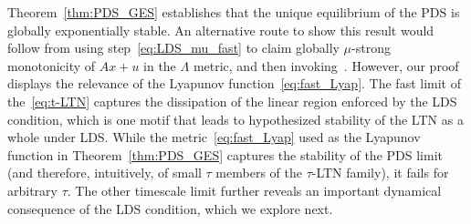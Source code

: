 \documentclass[letterpaper, conference]{ieeeconf}
\newcommand{\1}{\mathbf{1}}
\begin{document}
\medskip

Theorem~\ref{thm:PDS_GES} establishes that the unique equilibrium of the PDS is globally exponentially stable. 
An alternative route to show this result would follow from using step~\eqref{eq:LDS_mu_fast} to claim globally \(\mu\)-strong monotonicity of \(Ax + u\) in the \(\Lambda\) metric, and then invoking~\cite[Theorem 4.3]{DZ-AN:95}. However, our proof displays the relevance of the Lyapunov function~\eqref{eq:fast_Lyap}.
The fast limit of the~\eqref{eq:t-LTN} captures the dissipation of the linear region enforced by the LDS condition, which is one motif that leads to hypothesized stability of the LTN as a whole under LDS.
While the metric~\eqref{eq:fast_Lyap} used as the Lyapunov function in Theorem~\ref{thm:PDS_GES} captures the stability of the PDS limit (and therefore, intuitively, of small \(\tau\) members of the \(\tau\)-LTN family), it fails for arbitrary \(\tau\).
The other timescale limit further reveals an important dynamical consequence of the LDS condition, which we explore next.
\end{document}
